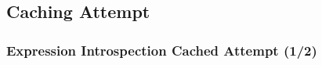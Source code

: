 \documentclass[10pt,aspectratio=169,utf8]{beamer}
\begin{document}
\subsection{Caching Attempt}
\begin{frame}
  \frametitle{Expression Introspection Cached Attempt (1/2)}

  \begin{columns}[T]
    \begin{column}{.5\textwidth}
    \end{column}
    \begin{column}{.5\textwidth}
    \end{column}
  \end{columns}
\end{frame}
\note{}
\end{document}

